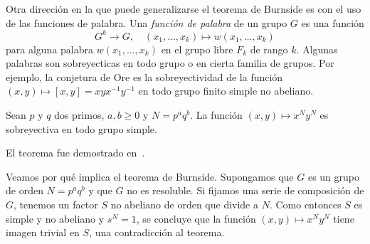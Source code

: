 Otra dirección en la que puede generalizarse el teorema de Burnside 
es con el uso de las funciones de palabra. 
Una \emph{función de palabra} de un grupo $G$ es una función 
\[
G^k\to G,\quad 
(x_1,\dots,x_k)\mapsto w(x_1,\dots,x_k)
\]
para alguna 
palabra $w(x_1,\dots,x_k)$ en el grupo libre $F_k$ de rango $k$. 
Algunas palabras son sobreyecticas en 
todo grupo o en cierta familia de grupos. Por ejemplo, 
la conjetura de Ore es la sobreyectividad de la función 
$(x,y)\mapsto [x,y]=xyx^{-1}y^{-1}$ en todo grupo finito simple no abeliano.

\begin{theorem}
Sean $p$ y $q$ dos primos, $a,b\geq0$ y $N=p^aq^b$. La función $(x,y)\mapsto x^Ny^N$ es 
sobreyectiva en todo grupo simple.
\end{theorem}

El teorema fue demostrado en~\cite{MR3827208}. 

Veamos por qué implica el teorema de Burnside. Supongamos que $G$ es un grupo de orden $N=p^aq^b$ y que $G$ no es resoluble. 
Si fijamos una serie de composición de $G$, tenemos un factor $S$ no abeliano de orden que divide a $N$. Como entonces
$S$ es simple y no abeliano y $s^N=1$, se concluye que la función $(x,y)\mapsto x^Ny^N$ tiene imagen trivial en $S$, una contradicción al teorema. 

